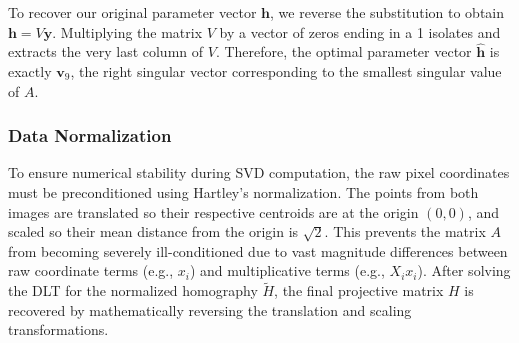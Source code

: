 To recover our original parameter vector $\mathbf{h}$, we reverse the substitution to obtain $\mathbf{h} = V\mathbf{y}$. Multiplying the matrix $V$ by a vector of zeros ending in a 1 isolates and extracts the very last column of $V$. Therefore, the optimal parameter vector $\hat{\mathbf{h}}$ is exactly $\mathbf{v}_9$, the right singular vector corresponding to the smallest singular value of $A$.

\subsubsection{Data Normalization}
To ensure numerical stability during SVD computation, the raw pixel coordinates must be preconditioned using Hartley's normalization. The points from both images are translated so their respective centroids are at the origin $(0,0)$, and scaled so their mean distance from the origin is $\sqrt{2}$. This prevents the matrix $A$ from becoming severely ill-conditioned due to vast magnitude differences between raw coordinate terms (e.g., $x_i$) and multiplicative terms (e.g., $X_i x_i$). After solving the DLT for the normalized homography $\tilde{H}$, the final projective matrix $H$ is recovered by mathematically reversing the translation and scaling transformations.